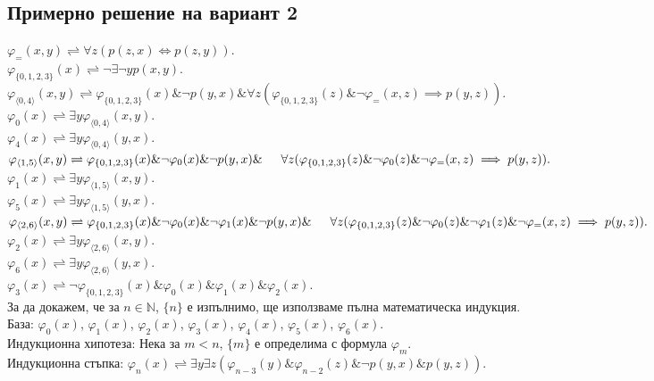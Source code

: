 \documentclass{article}
\begin{document}
\subsection{Примерно решение на вариант 2}
$ \varphi_{=}(x, y) \rightleftharpoons \forall z (p(z, x) \Leftrightarrow p(z, y)). $\\
$ \varphi_{\{0,1,2,3\}}(x) \rightleftharpoons \lnot \exists \lnot y p(x, y).$\\
$ \varphi_{\langle 0, 4 \rangle}(x, y) \rightleftharpoons \varphi_{\{0,1,2,3\}}(x)\&\lnot p(y, x)\& \forall z ( \varphi_{\{0,1,2,3\}}(z)\&\lnot \varphi_{=}(x, z) \implies p(y, z)). $\\
$ \varphi_{0}(x) \rightleftharpoons \exists y \varphi_{\langle 0, 4 \rangle}(x, y) . $\\
$ \varphi_{4}(x) \rightleftharpoons \exists y \varphi_{\langle 0, 4 \rangle}(y, x) . $\\
$ \varphi_{\langle 1, 5 \rangle}(x, y) \rightleftharpoons \varphi_{\{0,1,2,3\}}(x)\&\lnot \varphi_{0}(x)\&\lnot p(y, x)\& \\ \indent \forall z ( \varphi_{\{0,1,2,3\}}(z)\&\lnot \varphi_{0}(z)\&\lnot \varphi_{=}(x, z) \implies p(y, z)). $\\
$ \varphi_{1}(x) \rightleftharpoons \exists y \varphi_{\langle 1, 5 \rangle}(x, y) . $\\
$ \varphi_{5}(x) \rightleftharpoons \exists y \varphi_{\langle 1, 5 \rangle}(y, x) . $\\
$ \varphi_{\langle 2, 6 \rangle}(x, y) \rightleftharpoons \varphi_{\{0,1,2,3\}}(x)\&\lnot \varphi_{0}(x)\&\lnot \varphi_{1}(x)\&\lnot p(y, x)\& \\ \indent \forall z ( \varphi_{\{0,1,2,3\}}(z)\&\lnot \varphi_{0}(z)\&\lnot \varphi_{1}(z)\&\lnot \varphi_{=}(x, z) \implies  p(y, z)). $\\
$ \varphi_{2}(x) \rightleftharpoons \exists y \varphi_{\langle 2, 6 \rangle}(x, y) . $\\
$ \varphi_{6}(x) \rightleftharpoons \exists y \varphi_{\langle 2, 6 \rangle}(y, x) . $\\
$ \varphi_{3}(x) \rightleftharpoons \lnot \varphi_{\{0,1,2,3\}}(x)\&\varphi_{0}(x)\&\varphi_{1}(x)\&\varphi_{2}(x). $\\

За да докажем, че за $n \in \mathbb{N}$,  $\{n\}$ е изпълнимо, ще използваме пълна математическа индукция. \\
База: $\varphi_{0}(x)$, $\varphi_{1}(x)$, $\varphi_{2}(x)$, $\varphi_{3}(x)$, $\varphi_{4}(x)$, $\varphi_{5}(x)$, $\varphi_{6}(x)$. \\
Индукционна хипотеза: Нека за $m <n $, $\{m\}$ е определима с формула $\varphi_{m}$. \\
Индукционна стъпка: $ \varphi_{n}(x) \rightleftharpoons \exists y \exists z (\varphi_{n-3}(y)\&\varphi_{n-2}(z)\&\lnot p(y, x)\&p(y, z)). $\\
\end{document}
